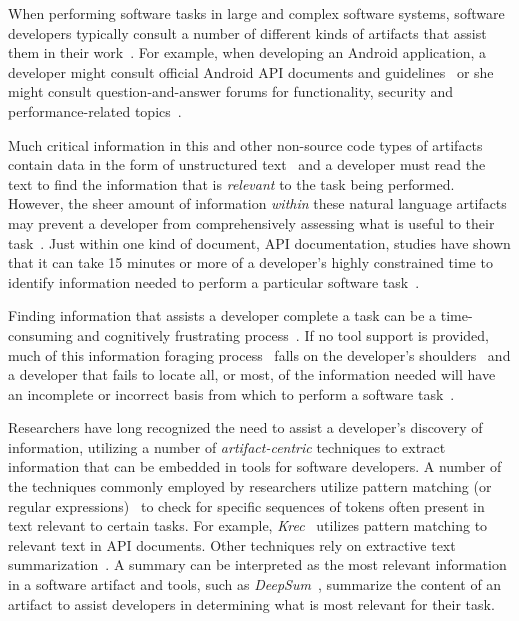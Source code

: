 

When performing software tasks in large and complex software systems, software developers typically consult a number of different kinds of artifacts that assist them in their work~\cite{Starke2009, Meyer2017}. For example, 
when developing an Android application, a developer might consult official Android API documents and guidelines~\cite{robillard2011field, umarji2008archetypal} or she might consult question-and-answer forums for functionality, security and performance-related topics~\cite{parnin2012, silva2019}.




Much critical information in this and other non-source code types of artifacts 
contain data in the form of unstructured text~\cite{Bavota2016} and 
a developer must read the text to find the information that is \textit{relevant} to the task being performed.
However, the sheer amount of information \textit{within} these natural language artifacts may prevent a developer from comprehensively assessing what is useful to their task~\cite{Murphy2005}.  Just within one kind of document, API
documentation, studies have shown that it can take 15 minutes or more
of a developer's highly constrained time to identify 
information needed to perform a particular software task~\cite{endrikat2014, Meyer2017}.


Finding information that assists a developer complete a task can be a time-consuming
and cognitively frustrating process~\cite{Begel2008,
robillard2011field}.
If no tool support is provided, much of this information foraging process~\cite{Pirolli1999, Just1980} falls on the developer's shoulders~\cite{gonccalves2011, Ko2006a, Bystrom1995} and a developer that fails to locate all, or most, of the information needed
 will have an incomplete or incorrect basis from which to perform a software task~\cite{Murphy2005}.





Researchers have long recognized the need to assist a developer's discovery of information,
utilizing a number of
\textit{artifact-centric} techniques
to extract
information that can be embedded in
tools for software developers. 
A number of the techniques commonly employed by researchers utilize pattern matching (or regular expressions)~\cite{Maalej2013, Bavota2014, Chaparro2017}   
to check for specific sequences of tokens often present in text relevant to certain tasks. For example, \textit{Krec}~\cite{Robillard2015} utilizes pattern matching to relevant text in API documents.
Other techniques rely on extractive text summarization~\cite{Rastkar2010, Lotufo2012, Murray2008}. 
A summary can be interpreted as the most relevant information in a software artifact 
and tools, such as \textit{DeepSum}~\cite{Li2018}, summarize the content of an artifact 
to assist developers in determining what is most relevant for their task.






